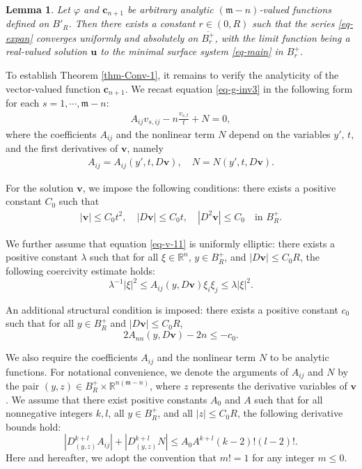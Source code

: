 \documentclass[11pt,reqno]{amsart}
\newcommand{\fm}{\mathfrak{m}}
\renewcommand{\leq}{\leqslant}
\newtheorem{lemma}[theorem]{Lemma}
\theoremstyle{definition}
\numberwithin{equation}{section}
\begin{document}
\begin{lemma}\label{lem-Fuschian}
    Let $\varphi$ and $\mathbf{c}_{n+1}$ be arbitrary analytic $(\fm -n)$-valued functions defined on $B'_R$. Then there exists a constant $r\in (0, R)$ such that the series \eqref{eq-expan} converges uniformly and absolutely on $\overline{B^+_r}$, with the limit function being a real-valued solution $\mathbf{u}$ to the minimal surface system \eqref{eq-main} in $B^+_r$.
\end{lemma}

To establish Theorem \ref{thm-Conv-1}, it remains to verify the analyticity of the vector-valued function $\mathbf{c}_{n+1}$. We recast equation \eqref{eq-g-inv3} in the following form for each $s=1,\cdots, \fm -n$:
\begin{align}\label{eq-v-11}
    A_{ij}v_{s,ij} - n \frac{v_{s,t}}{t}+N=0,
\end{align}
where the coefficients $A_{ij}$ and the nonlinear term $N$ depend on the variables $y'$, $t$, and the first derivatives of $\mathbf{v}$, namely
\begin{align}
    A_{ij} = A_{ij}(y',t, D\mathbf v),\quad N = N(y', t, D \mathbf v).
\end{align}

For the solution $\mathbf{v}$, we impose the following conditions: there exists a positive constant $C_0$ such that
\begin{align}
\label{eq-QuasiCondition}
|\mathbf v|\leq C_0t^2,\quad |D\mathbf v|\leq C_0t,\quad |D^2\mathbf v|\leq C_0\quad\text{in }B^+_R.
\end{align}

We further assume that equation \eqref{eq-v-11} is uniformly elliptic: there exists a positive constant $\lambda$ such that for all $\xi\in\mathbb R^n$, $y\in B^+_R$, and $|D\mathbf v|\leq C_0 R$, the following coercivity estimate holds:
\begin{equation}\label{eq-ellipticity} 
\lambda^{-1}|\xi|^2\leq A_{ij}(y, D\mathbf v)\xi_i\xi_j\leq \lambda|\xi|^2.
\end{equation}

An additional structural condition is imposed: there exists a positive constant $c_0$ such that for all $y\in B^+_R$ and $|D\mathbf v|\leq C_0 R$,
\begin{equation}\label{eq-Negative-Condition}2 A_{nn}(y, D\mathbf v)-2n\leq -c_0.\end{equation}

We also require the coefficients $A_{ij}$ and the nonlinear term $N$ to be analytic functions. For notational convenience, we denote the arguments of $A_{ij}$ and $N$ by the pair $(y,z)\in B^+_R\times\mathbb R^{n(\fm-n)}$, where $z$ represents the derivative variables of $\mathbf{v}$. We assume that there exist positive constants $A_0$ and $A$ such that for all nonnegative integers $k,l$, all $y\in B^+_R$, and all $|z| \leq C_0R$, the following derivative bounds hold:
\begin{equation}\label{eq-QuasiLinearAnalyticity-Assum1}
|D^{k+l}_{(y, z)}A_{ij}|+|D^{k+l}_{(y, z)}N|\leq A_0A^{k+l}(k-2)!(l-2)!.
\end{equation}
Here and hereafter, we adopt the convention that $m!=1$ for any integer $m\leq 0$.
\end{document}
